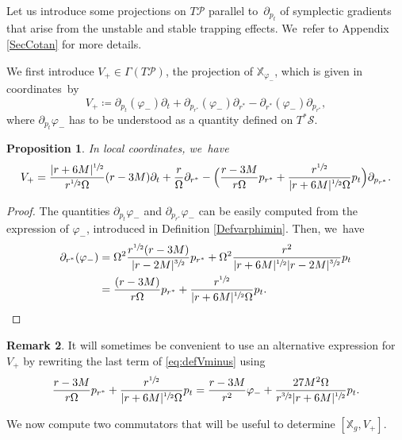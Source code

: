 \documentclass[10pt]{amsart}
\theoremstyle{plain}
\newtheorem{proposition}{Proposition}[section]
\theoremstyle{definition}
\newtheorem{remark}[proposition]{Remark}
\newcommand\T{{\mathbb{X}}}
\begin{document}
Let us introduce some projections on $T \mathcal{P}$ parallel to~$\partial_{p_t}$ of symplectic gradients that arise from the unstable and stable trapping effects. We~refer to Appendix \ref{SecCotan} for more details.

We first introduce $V_+\!\in\! \Gamma(T\mathcal{P})$, the projection of $\T_{\varphi_-}$, which is given in coordinates~by
\[
V_+\coloneqq \partial_{p_t}(\varphi_-)\partial_t +\partial_{p_{r^*}} (\varphi_-) \partial_{r^*}-\partial_{r^*} (\varphi_-) \partial_{p_{r^*}},
\]
where $\partial_{p_t} \varphi_-$ has to be understood as a quantity defined on $T^* \mathcal{S}$.

\begin{proposition}\label{ProdefVminus}
In local coordinates, we~have
\begin{equation}\label{eq:defVminus}
V_+ = \frac{|r+6M|^{\sfrac{1}{2}}}{r^{\sfrac{1}{2}}\Omega}(r-3M) \partial_t+\frac{r}{\Omega} \partial_{r^*}-\Bigl(\frac{r-3M}{r\Omega}p_{r^*}+\frac{r^{\sfrac{1}{2}}}{|r+6M|^{\sfrac{1}{2}} \Omega}p_t \Bigr) \partial_{p_{r^*}}.
\end{equation}
\end{proposition}
\begin{proof}
The quantities $\partial_{p_t} \varphi_-$ and $\partial_{p_{r^*}} \varphi_-$ can be easily computed from the expression of $\varphi_-$, introduced in Definition \ref{Defvarphimin}. Then, we~have
\begin{align*}
\partial_{r^*}(\varphi_-) & = \Omega^2\frac{r^{\sfrac{1}{2}}(r-3M)}{|r-2M|^{\sfrac{3}{2}}}p_{r^*} +\Omega^2\frac{r^2}{|r+6M|^{\sfrac{1}{2}} |r-2M|^{\sfrac{3}{2}}}p_t \\
& =\frac{(r-3M)}{r\Omega}p_{r^*}+\frac{r^{\sfrac{1}{2}}}{|r+6M|^{\sfrac{1}{2}} \Omega}p_t.\qedhere
\end{align*}
\end{proof}

\begin{remark}\label{RqVminus}
It will sometimes be convenient to use an alternative expression for~$V_+$ by rewriting the last term of \eqref{eq:defVminus} using
\begin{equation}\label{eq:equalityforVminus}
\frac{r-3M}{r\Omega}p_{r^*}+\frac{r^{\sfrac{1}{2}}}{|r+6M|^{\sfrac{1}{2}} \Omega}p_t= \frac{r-3M}{r^2} \varphi_- +\frac{27M^2 \Omega}{r^{\sfrac{3}{2}}|r+6M|^{\sfrac{1}{2}}}p_t.
\end{equation}
\end{remark}

We now compute two commutators that will be useful to determine $ [\T_g,V_+]$.
\end{document}
